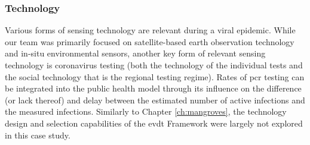 %
%
%
%




\subsubsection{Technology}

Various forms of sensing technology are relevant during a viral epidemic. While our team was primarily focused on satellite-based earth observation technology and in-situ environmental sensors, another key form of relevant sensing technology is coronavirus testing (both the technology of the individual tests and the social technology that is the regional testing regime). Rates of \ac{pcr} testing can be integrated into the public health model through its influence on the difference (or lack thereof) and delay between the estimated number of active infections and the measured infections. Similarly to Chapter \ref{ch:mangroves}, the technology design and selection capabilities of the \ac{evdt} Framework were largely not explored in this case study. 

